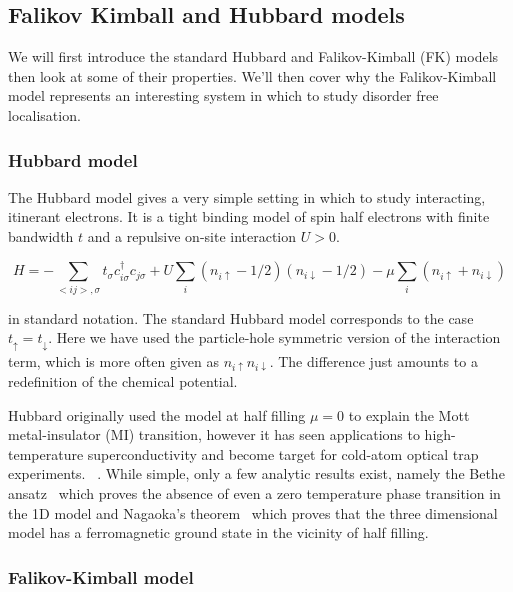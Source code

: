 \hypertarget{falikov-kimball-and-hubbard-models}{%
\subsection{Falikov Kimball and Hubbard models}\label{falikov-kimball-and-hubbard-models}}

We will first introduce the standard Hubbard and Falikov-Kimball (FK) models then look at some of their properties. We'll then cover why the Falikov-Kimball model represents an interesting system in which to study disorder free localisation.

\hypertarget{hubbard-model}{%
\subsubsection{Hubbard model}\label{hubbard-model}}

The Hubbard model gives a very simple setting in which to study interacting, itinerant electrons. It is a tight binding model of spin half electrons with finite bandwidth \(t\) and a repulsive on-site interaction \(U > 0\).

\[
    H = -\sum_{<ij>,\sigma} t_{\sigma} c^\dagger_{i\sigma}c_{j\sigma} + U \sum_{i} (n_{i \uparrow} - 1/2)( n_{i\downarrow} - 1/2) - \mu \sum_i \left( n_{i \uparrow} + n_{i \downarrow} \right)
\]

in standard notation. The standard Hubbard model corresponds to the case \(t_{\uparrow} = t_{\downarrow}\). Here we have used the particle-hole symmetric version of the interaction term, which is more often given as \(n_{i \uparrow} n_{i\downarrow}\). The difference just amounts to a redefinition of the chemical potential.

Hubbard originally used the model at half filling \(\mu = 0\) to explain the Mott metal-insulator (MI) transition, however it has seen applications to high-temperature superconductivity and become target for cold-atom optical trap experiments. ~\autocite{HubbardModelHalf2013,greiner_quantum_2002,jordens_mott_2008}. While simple, only a few analytic results exist, namely the Bethe ansatz~\autocite{liebAbsenceMottTransition1968} which proves the absence of even a zero temperature phase transition in the 1D model and Nagaoka's theorem~\autocite{nagaokaFerromagnetismNarrowAlmost1966} which proves that the three dimensional model has a ferromagnetic ground state in the vicinity of half filling.

\hypertarget{falikov-kimball-model}{%
\subsubsection{Falikov-Kimball model}\label{falikov-kimball-model}}

